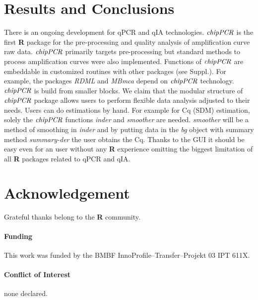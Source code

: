 \documentclass{bioinfo}
\begin{document}
\section{Results and Conclusions}

There is an ongoing development for qPCR and qIA technologies. $\emph{chipPCR}$ 
is the first \textbf{R} package for the pre-processing and quality 
analysis of amplification curve raw data. $\emph{chipPCR}$ 
primarily targets pre-processing but standard methods to process 
amplification curves were also implemented. Functions of $\emph{chipPCR}$ are embeddable in 
customized routines with other packages (see Suppl.). For example, the packages 
\emph{RDML} and \emph{MBmca} depend on $\emph{chipPCR}$ technology. 
$\emph{chipPCR}$ is build from smaller blocks. We claim that the modular 
structure of $\emph{chipPCR}$ package allows users to perform flexible data 
analysis adjusted to their needs. Users can do estimations by hand. For example 
for Cq (SDM) estimation, solely 
the $\emph{chipPCR}$ functions \textsl{inder} and \textsl{smoother} are needed. 
\textsl{smoother} will be a method of smoothing in \textsl{inder} and by putting 
data in the \textsl{bg} object with summary method \textsl{summary-der} the user 
obtains the Cq. Thanks to the GUI it should be easy even for an user without 
any \textbf{R} experience omitting the biggest limitation of all \textbf{R} 
packages related to qPCR and qIA.


\section*{Acknowledgement}
Grateful thanks belong to the \textbf{R} community.

\paragraph{Funding\textcolon} This work was funded by the BMBF InnoProfile--Transfer--Projekt 03 IPT 611X.

\paragraph{Conflict of Interest\textcolon} none declared.



%
%
%
%
%
%
%

\end{document}

